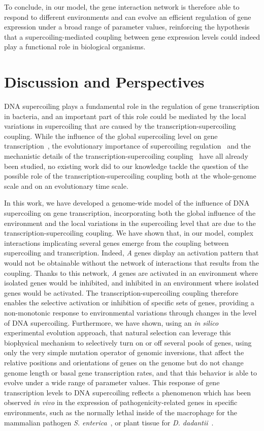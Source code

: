 To conclude, in our model, the gene interaction network is therefore able to respond to different environments and can evolve an efficient regulation of gene expression under a broad range of parameter values, reinforcing the hypothesis that a supercoiling-mediated coupling between gene expression levels could indeed play a functional role in biological organisms.

\section{Discussion and Perspectives}

DNA supercoiling plays a fundamental role in the regulation of gene transcription in bacteria, and an important part of this role could be mediated by the local variations in supercoiling that are caused by the transcription-supercoiling coupling.
While the influence of the global supercoiling level on gene transcription~\citep{lal2016, ma2016,dorman2016, martisb.2019}, the evolutionary importance of supercoiling regulation~\citep{crozat2005,crozat2010, duprey2021} and the mechanistic details of the transcription-supercoiling coupling~\citep{meyer2014, elhoudaigui2019} have all already been studied, no existing work did to our knowledge tackle the question of the possible role of the transcription-supercoiling coupling both at the whole-genome scale and on an evolutionary time scale.

In this work, we have developed a genome-wide model of the influence of DNA supercoiling on gene transcription, incorporating both the global influence of the environment and the local variations in the supercoiling level that are due to the transcription-supercoiling coupling.
We have shown that, in our model, complex interactions implicating several genes emerge from the coupling between supercoiling and transcription.
Indeed, \emph{A} genes display an activation pattern that would not be obtainable without the network of interactions that results from the coupling.
Thanks to this network, \emph{A} genes are activated in an environment where isolated genes would be inhibited, and inhibited in an environment where isolated genes would be activated.
The transcription-supercoiling coupling therefore enables the selective activation or inhibition of specific sets of genes, providing a non-monotonic response to environmental variations through changes in the level of DNA supercoiling.
Furthermore, we have shown, using an \emph{in silico} experimental evolution approach, that natural selection can leverage this biophysical mechanism to selectively turn on or off several pools of genes, using only the very simple mutation operator of genomic inversions, that affect the relative positions and orientations of genes on the genome but do not change genome length or basal gene transcription rates, and that this behavior is able to evolve under a wide range of parameter values.
This response of gene transcription levels to DNA supercoiling reflects a phenomenon which has been observed \emph{in vivo} in the expression of pathogenicity-related genes in specific environments, such as the normally lethal inside of the macrophage for the mammalian pathogen \emph{S. enterica}~\citep{cameron2013}, or plant tissue for \emph{D. dadantii}~\citep{herault2014}.

